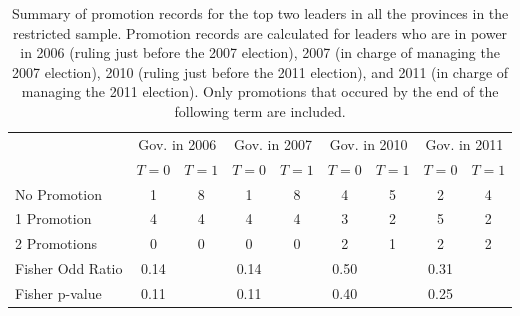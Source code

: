 \begin{table}[ht]
\centering
\begin{tabular}{lcccccccc}
   & \multicolumn{2}{c}{Gov. in 2006} & \multicolumn{2}{c}{Gov. in 2007} & \multicolumn{2}{c}{Gov. in 2010} & \multicolumn{2}{c}{Gov. in 2011} \\
 & $T = 0$ & $T = 1$ & $T = 0$ & $T = 1$ & $T = 0$ & $T = 1$ & $T = 0$ & $T = 1$ \\
 \hline
No Promotion & 1 & 8 & 1 & 8 & 4 & 5 & 2 & 4 \\ 
  1 Promotion & 4 & 4 & 4 & 4 & 3 & 2 & 5 & 2 \\ 
  2 Promotions & 0 & 0 & 0 & 0 & 2 & 1 & 2 & 2 \\ 
   \hline
Fisher Odd Ratio & 0.14 &  & 0.14 &  & 0.50 &  & 0.31 &  \\ 
  Fisher p-value & 0.11 &  & 0.11 &  & 0.40 &  & 0.25 &  \\ 
  \end{tabular}
\caption{Summary of promotion records for the top two leaders in all the provinces in the restricted sample. 
             Promotion records are calculated for leaders who are in power in 2006 (ruling just before the 2007 election), 2007 (in charge of managing the 2007 election),
             2010 (ruling just before the 2011 election), and 2011 (in charge of managing the 2011 election). Only promotions that occured by the end
             of the following term are included.} 
\label{tab:promo_mech}
\end{table}
